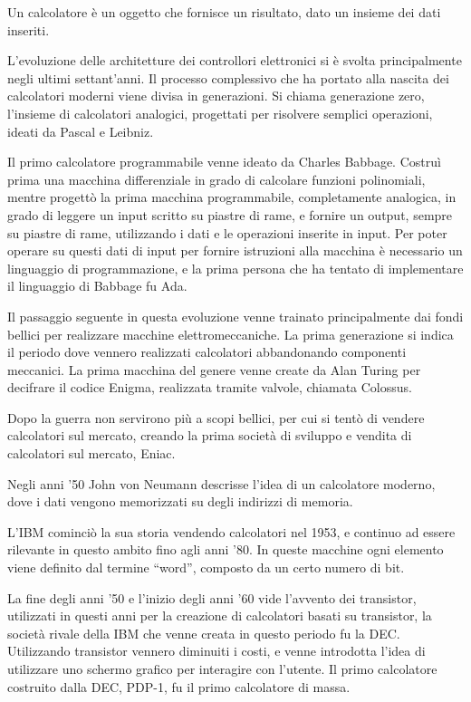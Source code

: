 \documentclass{article}
\numberwithin{equation}{subsection}
\begin{document}


Un calcolatore è un oggetto che fornisce un risultato, dato un insieme dei dati inseriti. 


L'evoluzione delle architetture dei controllori elettronici si è svolta principalmente negli ultimi settant'anni. Il processo complessivo che ha portato alla nascita 
dei calcolatori moderni viene divisa in generazioni. 
Si chiama generazione zero, l'insieme di calcolatori analogici, progettati per risolvere semplici operazioni, ideati da Pascal e Leibniz. 

Il primo calcolatore programmabile venne ideato da Charles Babbage. Costruì prima una macchina differenziale in grado di calcolare funzioni polinomiali, mentre progettò la 
prima macchina programmabile, completamente analogica, in grado di leggere un input scritto su piastre di rame, e fornire un output, sempre su piastre di rame, utilizzando 
i dati e le operazioni inserite in input. Per poter operare su questi dati di input per fornire istruzioni alla macchina è necessario un linguaggio di programmazione, e la 
prima persona che ha tentato di implementare il linguaggio di Babbage fu Ada. %


Il passaggio seguente in questa evoluzione venne trainato principalmente dai fondi bellici per realizzare macchine elettromeccaniche. La prima generazione si indica il 
periodo dove vennero realizzati calcolatori abbandonando componenti meccanici. La prima macchina del genere venne create da Alan Turing per decifrare il codice Enigma, 
realizzata tramite valvole, chiamata Colossus. 



Dopo la guerra non servirono più a scopi bellici, per cui si tentò di vendere calcolatori sul mercato, creando la prima società di sviluppo e vendita di calcolatori 
sul mercato, Eniac. 

Negli anni '50 John von Neumann descrisse l'idea di un calcolatore moderno, dove i dati vengono memorizzati su degli indirizzi di memoria. 

L'IBM cominciò la sua storia vendendo calcolatori nel 1953, e continuo ad essere rilevante in questo ambito fino agli anni '80. 
In queste macchine ogni elemento viene definito dal termine ``word'', composto da un certo numero di bit. 


La fine degli anni '50 e l'inizio degli anni '60 vide l'avvento dei transistor, utilizzati in questi anni per la creazione di calcolatori basati su transistor, la società 
rivale della IBM che venne creata in questo periodo fu la DEC. Utilizzando transistor vennero diminuiti i costi, e venne introdotta l'idea di utilizzare uno schermo grafico 
per interagire con l'utente. Il primo calcolatore costruito dalla DEC, PDP-1, fu il primo calcolatore di massa. 
\end{document}
